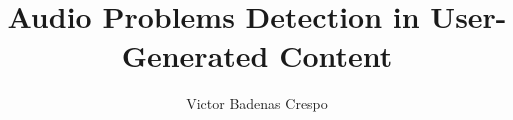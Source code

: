 \documentclass[a4paper,12pt,twoside]{report}
\begin{document}

\title{Audio Problems Detection in User-Generated Content}
\author{Victor Badenas Crespo}

\maketitle

\maketitle
\restoregeometry

\preface
\cleardoublepage 



\body







\listoffigures
\newpage
\listoftables




% 
\end{document}
